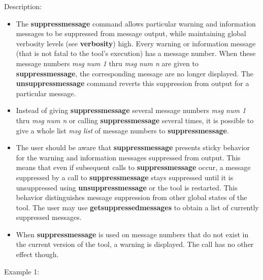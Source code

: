\noindent Description: \begin{itemize}

\item The \textbf{suppressmessage} command allows particular warning and information
   messages to be suppressed from message output, while maintaining
   global verbosity levels (see \textbf{verbosity}) high. Every \sollya warning
   or information message (that is not fatal to the tool's execution) has
   a message number. When these message numbers \emph{msg num 1} thru \emph{msg num n} 
   are given to \textbf{suppressmessage}, the corresponding message are no longer
   displayed.  The \textbf{unsuppressmessage} command reverts this suppression
   from output for a particular message.

\item Instead of giving \textbf{suppressmessage} several message numbers \emph{msg num 1} thru
   \emph{msg num n} or calling \textbf{suppressmessage} several times, it is possible to give
   a whole list \emph{msg list} of message numbers to \textbf{suppressmessage}.

\item The user should be aware that \textbf{suppressmessage} presents sticky behavior for
   the warning and information messages suppressed from output. This
   means that even if subsequent calls to \textbf{suppressmessage} occur, a message
   suppressed by a call to \textbf{suppressmessage} stays suppressed until it is
   unsuppressed using \textbf{unsuppressmessage} or the tool is restarted. This
   behavior distinguishes message suppression from other global states of
   the \sollya tool. The user may use \textbf{getsuppressedmessages} to obtain a
   list of currently suppressed messages.

\item When \textbf{suppressmessage} is used on message numbers that do not exist in the
   current version of the tool, a warning is displayed. The call has no
   other effect though.
\end{itemize}
\noindent Example 1: 
